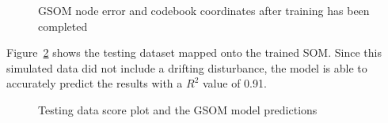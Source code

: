 \documentclass[review,3p]{elsarticle}
\renewcommand\[{\begin{equation}}
\renewcommand\]{\end{equation}}
\begin{document}
\begin{figure}[htpb]
  \centering
  \caption{GSOM node error and codebook coordinates after training has been completed}
  \label{fig:gsmmsfig2}
\end{figure}

Figure~\ref{fig:gsmmsfig3} shows the testing dataset mapped onto the trained
SOM. Since this simulated data did not include a drifting disturbance, the
model is able to accurately predict the results with a $R^2$ value of 0.91.

\begin{figure}[htpb]
  \centering
  \caption{Testing data score plot and the GSOM model predictions}
  \label{fig:gsmmsfig3}
\end{figure}
\end{document}
